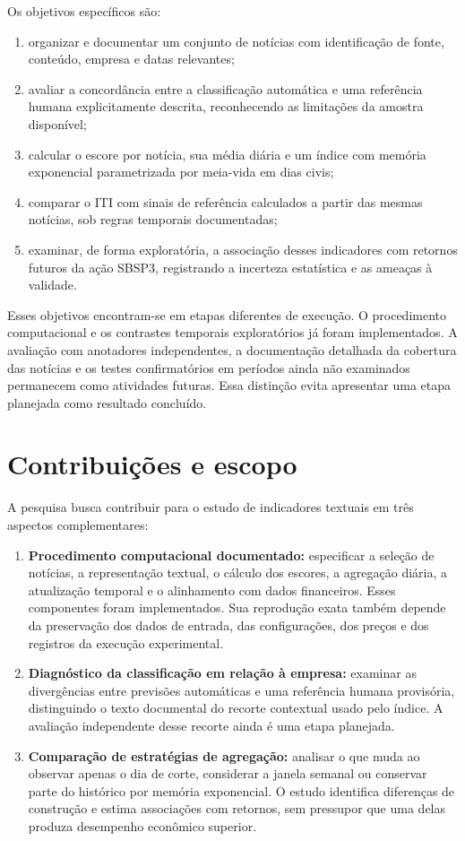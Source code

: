 Os objetivos específicos são:
\begin{enumerate}
    \item organizar e documentar um conjunto de notícias com identificação de fonte, conteúdo, empresa e datas relevantes;
    \item avaliar a concordância entre a classificação automática e uma referência humana explicitamente descrita, reconhecendo as limitações da amostra disponível;
    \item calcular o escore por notícia, sua média diária e um índice com memória exponencial parametrizada por meia-vida em dias civis;
    \item comparar o ITI com sinais de referência calculados a partir das mesmas notícias, sob regras temporais documentadas;
    \item examinar, de forma exploratória, a associação desses indicadores com retornos futuros da ação SBSP3, registrando a incerteza estatística e as ameaças à validade.
\end{enumerate}

Esses objetivos encontram-se em etapas diferentes de execução. O procedimento computacional e os contrastes temporais exploratórios já foram implementados. A avaliação com anotadores independentes, a documentação detalhada da cobertura das notícias e os testes confirmatórios em períodos ainda não examinados permanecem como atividades futuras. Essa distinção evita apresentar uma etapa planejada como resultado concluído.

\section{Contribuições e escopo}

A pesquisa busca contribuir para o estudo de indicadores textuais em três aspectos complementares:
\begin{enumerate}
    \item \textbf{Procedimento computacional documentado:} especificar a seleção de notícias, a representação textual, o cálculo dos escores, a agregação diária, a atualização temporal e o alinhamento com dados financeiros. Esses componentes foram implementados. Sua reprodução exata também depende da preservação dos dados de entrada, das configurações, dos preços e dos registros da execução experimental.
    \item \textbf{Diagnóstico da classificação em relação à empresa:} examinar as divergências entre previsões automáticas e uma referência humana provisória, distinguindo o texto documental do recorte contextual usado pelo índice. A avaliação independente desse recorte ainda é uma etapa planejada.
    \item \textbf{Comparação de estratégias de agregação:} analisar o que muda ao observar apenas o dia de corte, considerar a janela semanal ou conservar parte do histórico por memória exponencial. O estudo identifica diferenças de construção e estima associações com retornos, sem pressupor que uma delas produza desempenho econômico superior.
\end{enumerate}

